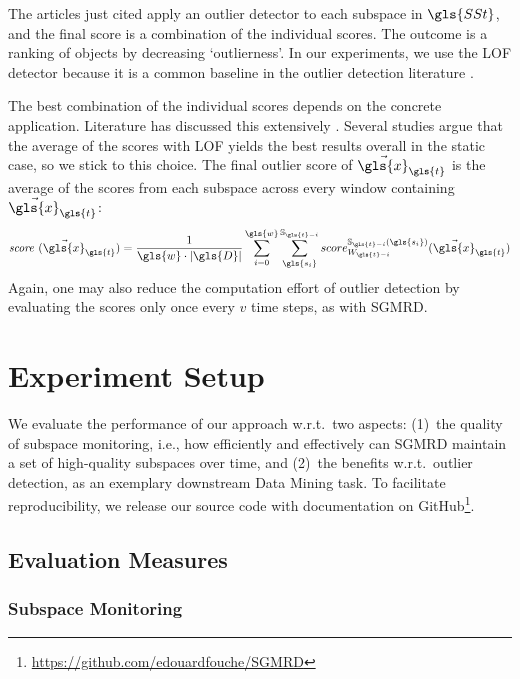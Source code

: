 The articles just cited apply an outlier detector to each subspace in $\gls{SSt}$, and the final score is a combination of the individual scores. 
The outcome is a ranking of objects by decreasing `outlierness'. 
In our experiments, we use the \gls{LOF} detector
because it is a common baseline in the outlier detection literature \cite{DBLP:conf/icde/KellerMB12}. 

The best combination of the individual scores depends on the concrete application.
Literature has discussed this extensively  \cite{DBLP:journals/sigkdd/AggarwalS15, DBLP:journals/datamine/VinhCRBLRP16}. 
Several studies \cite{lazarevic2005feature, DBLP:conf/cidm/PokrajacLL07} argue that the average of the scores with \gls{LOF} yields the best results overall in the static case, so we stick to this choice. The final outlier score of $\vec{\gls{x}}_{\gls{t}}$ is the average of the scores from each subspace across every window containing $\vec{\gls{x}}_{\gls{t}}$: 
\begin{align}
\textit{score}^{~}(\vec{\gls{x}}_{\gls{t}}) = \frac{1}{\gls{w} \cdot |\gls{D}|} \sum_{i=0}^{\gls{w}} \sum_{\gls{s_i}}^{\mathbb{S}_{{\gls{t}}-i}} score_{W_{{\gls{t}}-i}}^{\mathbb{S}_{{\gls{t}}-i}(\gls{s_i})}(\vec{\gls{x}}_{\gls{t}})  
\end{align}
Again, one may also reduce the computation effort of outlier detection by evaluating the scores only once every $v$ time steps, as with \gls{SGMRD}. 

\section{Experiment Setup}

We evaluate the performance of our approach w.r.t.\ two aspects: (1)~the quality of subspace monitoring, i.e., how efficiently and effectively can \gls{SGMRD} maintain a set of high-quality subspaces over time, and (2)~the benefits w.r.t.\ outlier detection, as an exemplary downstream Data Mining task. To facilitate reproducibility, we release our source code with documentation on GitHub\footnote{\url{https://github.com/edouardfouche/SGMRD}}. 

\subsection{Evaluation Measures}

\subsubsection{Subspace Monitoring}


